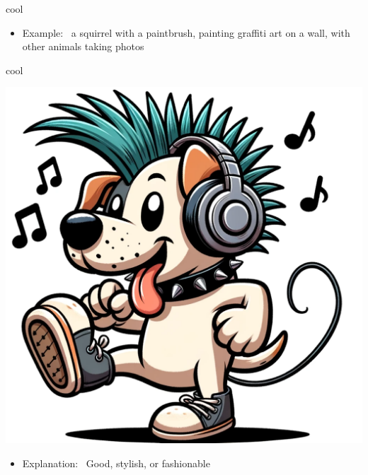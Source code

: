 \documentclass[avery5371, grid,frame]{flashcards}
\begin{document}
\begin{flashcard}{cool}
\begin{center}
\begin{minipage}[c]{.45\textwidth}
\begin{itemize}
            \item Example: \ a squirrel with a paintbrush, painting graffiti art on a wall, with other animals taking photos
            \end{itemize}
        \end{minipage}
    \end{center}
    \vspace*{\fill}
\end{flashcard}\begin{flashcard}{cool}
    \vspace*{\fill}
    \begin{center}
        \begin{minipage}[c]{.45\textwidth}
            \includegraphics[width=\textwidth]{cards/c/cool/cool - a dog with a mohawk hairstyle, listening to music on headphones, and tapping its foot.png}
        \end{minipage}
        \begin{minipage}[c]{.45\textwidth}
            \begin{itemize}\setlength\itemsep{12pt}
            \item Explanation: \ Good, stylish, or fashionable


\end{itemize}
\end{minipage}
\end{center}
\end{flashcard}
\end{document}
